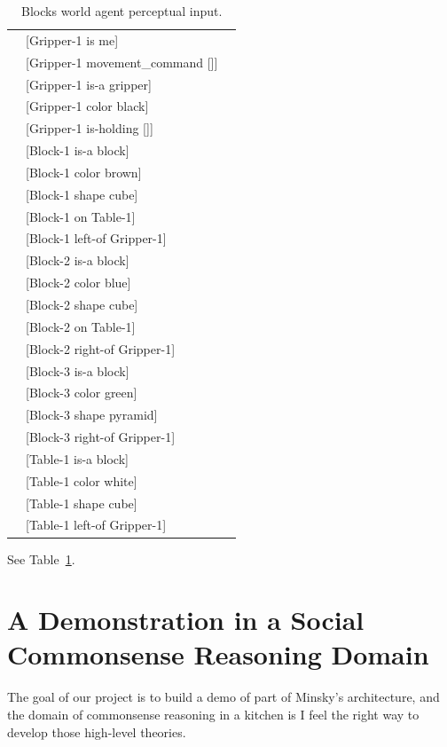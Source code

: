 \begin{table}
  \myfloatalign
  \begin{tabularx}{\textwidth}{XlX}
    & [Gripper-1 is me] & \\
    & [Gripper-1 movement\_command []] & \\
    & [Gripper-1 is-a gripper] & \\
    & [Gripper-1 color black] & \\
    & [Gripper-1 is-holding []] & \\
    & [Block-1 is-a block] & \\
    & [Block-1 color brown] & \\
    & [Block-1 shape cube] & \\
    & [Block-1 on Table-1] & \\
    & [Block-1 left-of Gripper-1] & \\
    & [Block-2 is-a block] & \\
    & [Block-2 color blue] & \\
    & [Block-2 shape cube] & \\
    & [Block-2 on Table-1] & \\
    & [Block-2 right-of Gripper-1] & \\
    & [Block-3 is-a block] & \\
    & [Block-3 color green] & \\
    & [Block-3 shape pyramid] & \\
    & [Block-3 right-of Gripper-1] & \\
    & [Table-1 is-a block] & \\
    & [Table-1 color white] & \\
    & [Table-1 shape cube] & \\
    & [Table-1 left-of Gripper-1] &
  \end{tabularx}
  \caption[Blocks world agent perceptual input.]{Blocks world agent perceptual input.}
  \label{tab:blocks_world_agent_perceptions}
\end{table}

See Table~\ref{tab:blocks_world_agent_perceptions}.





\section{A Demonstration in a Social Commonsense Reasoning Domain}

The goal of our project is to build a demo of part of Minsky's
architecture, and the domain of commonsense reasoning in a kitchen is
I feel the right way to develop those high-level theories.

